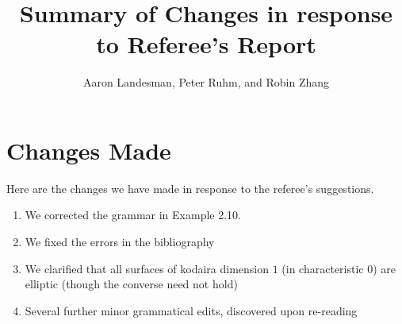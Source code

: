 \documentclass[10 pt]{amsart}
\title{Summary of Changes in response to Referee's Report}
\author{Aaron Landesman, Peter Ruhm, and Robin Zhang}
\theoremstyle{plain}
\theoremstyle{definition}
\theoremstyle{remark}
\numberwithin{equation}{section}
\begin{document}
\maketitle
\section{Changes Made}
Here are the changes we have made in response to the referee's suggestions.
\begin{enumerate}
	\item We corrected the grammar in Example 2.10.
	\item We fixed the errors in the bibliography
	\item We clarified that all surfaces of kodaira dimension $1$ (in characteristic $0$) are elliptic (though the converse need not hold)
	\item Several further minor grammatical edits, discovered upon re-reading
\end{enumerate}
\end{document}
